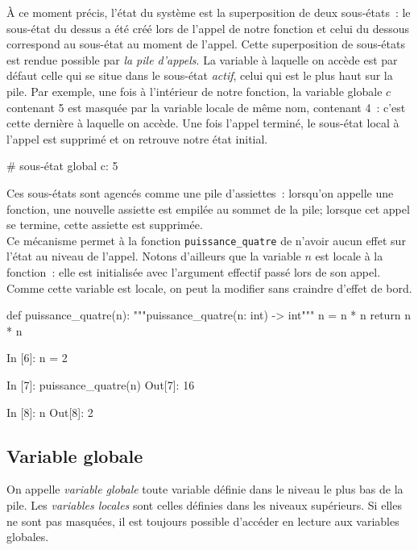 \documentclass{magnoliaold}
\begin{document}
\noindent À ce moment précis, l'état du système est la superposition de deux sous-états~:
le sous-état du dessus a été créé lors de l'appel de notre fonction et celui du dessous
correspond au sous-état au moment de l'appel.
Cette superposition de sous-états est rendue possible par \emph{la pile d'appels}.
La variable à laquelle on accède est par défaut celle qui se situe dans le sous-état \emph{actif},
celui qui est le plus haut sur la pile. Par exemple, une fois à l'intérieur de notre fonction, la variable globale $c$ contenant
5 est masquée par la variable locale de même nom, contenant 4~: c'est cette dernière à laquelle
on accède. Une fois l'appel 
terminé, le sous-état local à l'appel est supprimé et on retrouve notre état initial.

\begin{pythoncode}
# sous-état global          {c: 5}
\end{pythoncode}

\noindent Ces sous-états sont agencés comme une pile d'assiettes~: lorsqu'on appelle une
fonction, une nouvelle \og assiette \fg est empilée au sommet de la pile; lorsque
cet appel se termine, cette assiette est supprimée.\\

Ce mécanisme permet à la fonction \verb+puissance_quatre+ de n'avoir aucun effet
sur l'état au niveau de l'appel.
Notons d'ailleurs que la variable $n$ est locale à la fonction~: elle est initialisée
avec l'argument effectif passé lors de son appel. Comme cette variable est locale,
on peut la modifier sans craindre d'effet de bord.

\begin{pythoncodeline}
def puissance_quatre(n):
    """puissance_quatre(n: int) -> int"""
    n = n * n
    return n * n
\end{pythoncodeline}

\begin{pythoncode}
In [6]: n = 2

In [7]: puissance_quatre(n)
Out[7]: 16

In [8]: n
Out[8]: 2
\end{pythoncode}

\subsection{Variable globale}

On appelle \emph{variable globale} toute variable définie dans le niveau le plus bas de la pile. Les \emph{variables locales} sont celles définies dans les niveaux supérieurs.
Si elles ne sont pas masquées, il est toujours possible d'accéder en lecture aux variables globales.
\end{document}
